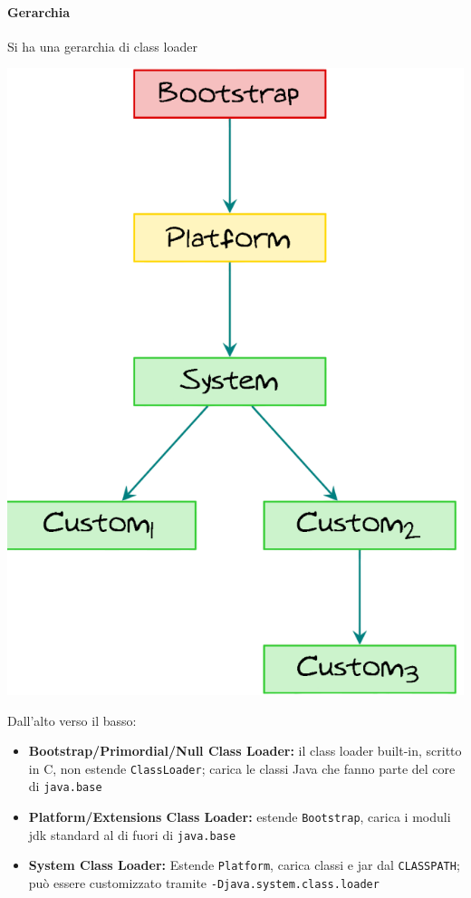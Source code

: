\newpage

\paragraph{Gerarchia} Si ha una gerarchia di class loader

\begin{center}
    \includegraphics[width=0.45\columnwidth]{img/rij/clHierarchy}
\end{center}

Dall'alto verso il basso:
\begin{itemize}
    \item \textbf{Bootstrap/Primordial/Null Class Loader:} il class loader built-in, scritto in C, non estende \texttt{ClassLoader}; carica le classi Java che fanno parte del core di \texttt{java.base}

    \item \textbf{Platform/Extensions Class Loader:} estende \texttt{Bootstrap}, carica i moduli jdk standard al di fuori di \texttt{java.base}

    \item \textbf{System Class Loader:} Estende \texttt{Platform}, carica classi e jar dal \texttt{CLASSPATH}; può essere customizzato tramite \texttt{-Djava.system.class.loader}
\end{itemize}

